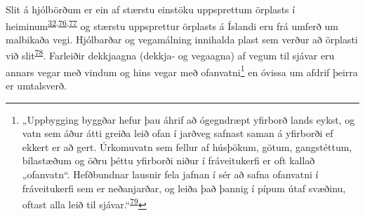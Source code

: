 \documentclass[icelandic,]{book}
\let\rmarkdownfootnote\footnote%
\def\footnote{\protect\rmarkdownfootnote}
\begin{document}
Slit á hjólbörðum er ein af stærstu einstöku uppsprettum örplasts í heiminum\textsuperscript{\protect\hyperlink{ref-sundt2014sources}{32},\protect\hyperlink{ref-lassen2015microplastics}{76},\protect\hyperlink{ref-essel2015sources}{77}} og stærstu uppsprettur örplasts á Íslandi eru frá umferð um malbikaða vegi. Hjólbarðar og vegamálning innihalda plast sem verður að örplasti við slit\textsuperscript{\protect\hyperlink{ref-kreider2010physical}{78}}. Farleiðir dekkjaagna (dekkja- og vegaagna) af vegum til sjávar eru annars vegar með vindum og hins vegar með ofanvatni\footnote{„Uppbygging byggðar hefur þau áhrif að ógegndræpt yfirborð lands eykst, og vatn sem áður átti greiða leið ofan í jarðveg safnast saman á yfirborði ef ekkert er að gert. Úrkomuvatn sem fellur af húsþökum, götum, gangstéttum, bílastæðum og öðru þéttu yfirborði niður í fráveitukerfi er oft kallað „ofanvatn``. Hefðbundnar lausnir fela jafnan í sér að safna ofanvatni í fráveitukerfi sem er neðanjarðar, og leiða það þannig í pípum útaf svæðinu, oftast alla leið til sjávar.``\textsuperscript{\protect\hyperlink{ref-StefanFreyr}{79}}} en óvissa um afdrif þeirra er umtalsverð.
\end{document}
